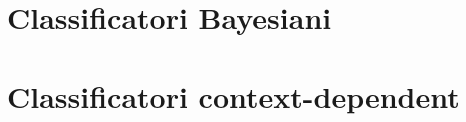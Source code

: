 \documentclass[italian, disablemarginnotes, allowcoloredmath]{../../../Resources/Utils/ClassNotes}
\begin{document}

\section{Classificatori Bayesiani}


\section{Classificatori context-dependent}

\end{document}
